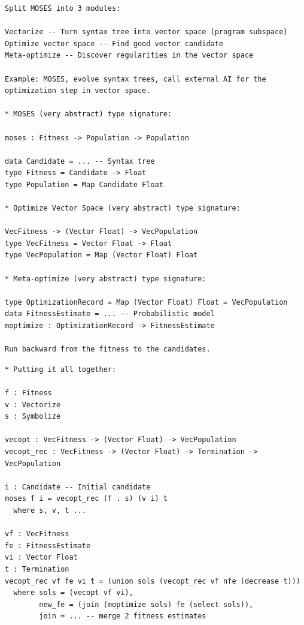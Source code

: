 \documentclass[aspectratio=169]{beamer}
\begin{document}
\begin{frame}[fragile]

{\tiny
\begin{verbatim}
Split MOSES into 3 modules:

Vectorize -- Turn syntax tree into vector space (program subspace)
Optimize vector space -- Find good vector candidate
Meta-optimize -- Discover regularities in the vector space

Example: MOSES, evolve syntax trees, call external AI for the
optimization step in vector space.

* MOSES (very abstract) type signature:

moses : Fitness -> Population -> Population

data Candidate = ... -- Syntax tree
type Fitness = Candidate -> Float
type Population = Map Candidate Float

* Optimize Vector Space (very abstract) type signature:

VecFitness -> (Vector Float) -> VecPopulation
type VecFitness = Vector Float -> Float
type VecPopulation = Map (Vector Float) Float

* Meta-optimize (very abstract) type signature:

type OptimizationRecord = Map (Vector Float) Float = VecPopulation
data FitnessEstimate = ... -- Probabilistic model
moptimize : OptimizationRecord -> FitnessEstimate

Run backward from the fitness to the candidates.
\end{verbatim}
}



\end{frame}

\begin{frame}[fragile]

{\tiny
\begin{verbatim}
* Putting it all together:

f : Fitness
v : Vectorize
s : Symbolize

vecopt : VecFitness -> (Vector Float) -> VecPopulation
vecopt_rec : VecFitness -> (Vector Float) -> Termination -> VecPopulation

i : Candidate -- Initial candidate
moses f i = vecopt_rec (f . s) (v i) t
  where s, v, t ...

vf : VecFitness
fe : FitnessEstimate
vi : Vector Float
t : Termination
vecopt_rec vf fe vi t = (union sols (vecopt_rec vf nfe (decrease t)))
  where sols = (vecopt vf vi),
        new_fe = (join (moptimize sols) fe (select sols)),
        join = ... -- merge 2 fitness estimates  
\end{verbatim}
}

\end{frame}
\end{document}
